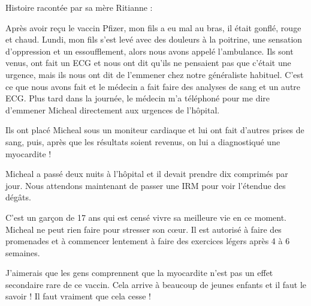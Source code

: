 Histoire racontée par sa mère Ritianne :

Après avoir reçu le vaccin Pfizer, mon fils a eu mal au bras, il était gonflé,
rouge et chaud. Lundi, mon fils s'est levé avec des douleurs à la poitrine, une
sensation d'oppression et un essoufflement, alors nous avons appelé
l'ambulance. Ils sont venus, ont fait un ECG et nous ont dit qu'ils ne pensaient
pas que c'était une urgence, mais ils nous ont dit de l'emmener chez notre
généraliste habituel. C'est ce que nous avons fait et le médecin a fait faire
des analyses de sang et un autre ECG. Plus tard dans la journée, le médecin m'a
téléphoné pour me dire d'emmener Micheal directement aux urgences de l'hôpital.

Ils ont placé Micheal sous un moniteur cardiaque et lui ont fait d'autres prises
de sang, puis, après que les résultats soient revenus, on lui a diagnostiqué une
myocardite !

Micheal a passé deux nuits à l'hôpital et il devait prendre dix comprimés par
jour. Nous attendons maintenant de passer une IRM pour voir l'étendue des
dégâts.

C'est un garçon de 17 ans qui est censé vivre sa meilleure vie en ce
moment. Micheal ne peut rien faire pour stresser son cœur. Il est autorisé à
faire des promenades et à commencer lentement à faire des exercices légers après
4 à 6 semaines.

J'aimerais que les gens comprennent que la myocardite n'est pas un effet
secondaire rare de ce vaccin. Cela arrive à beaucoup de jeunes enfants et il
faut le savoir ! Il faut vraiment que cela cesse !
